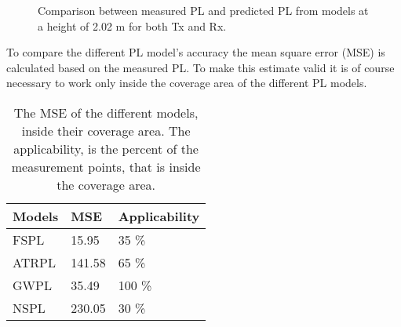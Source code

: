 \begin{figure}[H]
\centering

\caption{Comparison between measured PL and predicted PL from models at a height of 2.02 m for both Tx and Rx.}
\label{Models10}
\end{figure}





To compare the different PL model's accuracy the mean square error (MSE) is calculated based on the measured PL. To make this estimate valid it is of course necessary to work only inside the coverage area of the different PL models. 




\begin{table}[!htbp]
\centering
\caption{The MSE of the different models, inside their coverage area. The applicability, is the percent of the measurement points, that is inside the coverage area.}
\label{model_comparison}
\begin{tabular}{|l|l|l|}
\hline
\textbf{Models} & \textbf{MSE} & \textbf{Applicability} \\ \hline
FSPL            & 15.95        & 35 \%                  \\ \hline
ATRPL 		    & 141.58       & 65 \%                  \\ \hline %
GWPL            & 35.49        & 100 \%                 \\ \hline
NSPL            & 230.05       & 30 \%                  \\ \hline
\end{tabular}
\end{table}
\vspace{2em}



